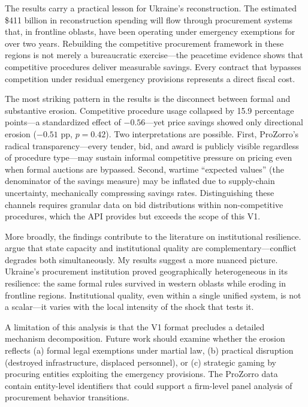 \documentclass[12pt]{article}
\begin{document}
The results carry a practical lesson for Ukraine's reconstruction. The estimated \$411 billion in reconstruction spending will flow through procurement systems that, in frontline oblasts, have been operating under emergency exemptions for over two years. Rebuilding the competitive procurement framework in these regions is not merely a bureaucratic exercise---the peacetime evidence shows that competitive procedures deliver measurable savings. Every contract that bypasses competition under residual emergency provisions represents a direct fiscal cost.

The most striking pattern in the results is the disconnect between formal and substantive erosion. Competitive procedure usage collapsed by 15.9 percentage points---a standardized effect of $-0.56$---yet price savings showed only directional erosion ($-0.51$ pp, $p = 0.42$). Two interpretations are possible. First, ProZorro's radical transparency---every tender, bid, and award is publicly visible regardless of procedure type---may sustain informal competitive pressure on pricing even when formal auctions are bypassed. Second, wartime ``expected values'' (the denominator of the savings measure) may be inflated due to supply-chain uncertainty, mechanically compressing savings rates. Distinguishing these channels requires granular data on bid distributions within non-competitive procedures, which the API provides but exceeds the scope of this V1.

More broadly, the findings contribute to the literature on institutional resilience. \citet{Besley2010} argue that state capacity and institutional quality are complementary---conflict degrades both simultaneously. My results suggest a more nuanced picture. Ukraine's procurement institution proved geographically heterogeneous in its resilience: the same formal rules survived in western oblasts while eroding in frontline regions. Institutional quality, even within a single unified system, is not a scalar---it varies with the local intensity of the shock that tests it.

A limitation of this analysis is that the V1 format precludes a detailed mechanism decomposition. Future work should examine whether the erosion reflects (a) formal legal exemptions under martial law, (b) practical disruption (destroyed infrastructure, displaced personnel), or (c) strategic gaming by procuring entities exploiting the emergency provisions. The ProZorro data contain entity-level identifiers that could support a firm-level panel analysis of procurement behavior transitions.
\end{document}
